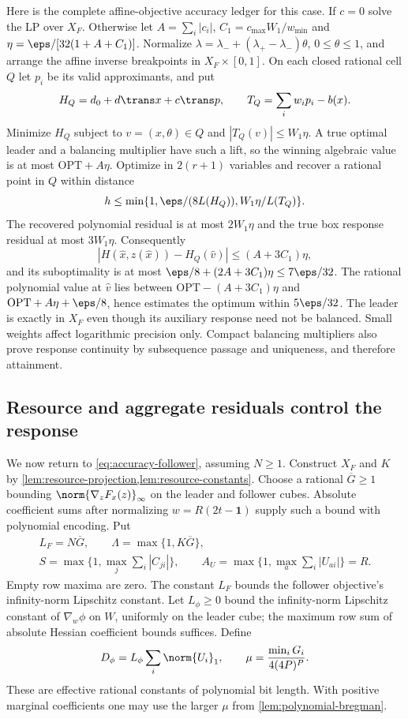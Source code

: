 Here is the complete affine-objective accuracy ledger for this case.
If $c=0$ solve the LP over $X_F$. Otherwise let
$A=\sum_i|c_i|$, $C_1=c_{\max}W_1/w_{\min}$ and
$\eta=\eps/[32(1+A+C_1)]$. Normalize
$\lambda=\lambda_-+(\lambda_+-\lambda_-)\theta$,
$0\le\theta\le1$, and arrange the affine inverse breakpoints in
$X_F\times[0,1]$. On each closed rational cell $Q$ let $p_i$ be its
valid approximants, and put
\[
 H_Q=d_0+d\trans x+c\trans p,\qquad T_Q=\sum_iw_ip_i-b(x).
\]
Minimize $H_Q$ subject to $v=(x,\theta)\in Q$ and
$|T_Q(v)|\le W_1\eta$. A true optimal leader and a balancing multiplier
have such a lift, so the winning algebraic value is at most
$\mathrm{OPT}+A\eta$. Optimize in $2(r+1)$ variables and recover a
rational point in $Q$ within distance
\[
 h\le\min\{1,\eps/(8L(H_Q)),W_1\eta/L(T_Q)\}.
\]
The recovered polynomial residual is at most $2W_1\eta$ and the
true box response residual at most $3W_1\eta$. Consequently
\[
 |H(\widehat x,z(\widehat x))-H_Q(\widehat v)|
      \le(A+3C_1)\eta,
\]
and its suboptimality is at most
$\eps/8+(2A+3C_1)\eta\le7\eps/32$. The rational polynomial value
at $\widehat v$ lies between
$\mathrm{OPT}-(A+3C_1)\eta$ and
$\mathrm{OPT}+A\eta+\eps/8$, hence estimates the optimum within
$5\eps/32$. The leader is exactly in $X_F$ even though its auxiliary
response need not be balanced. Small weights affect logarithmic precision
only. Compact balancing multipliers also prove response continuity by
subsequence passage and uniqueness, and therefore attainment.

\subsection{Resource and aggregate residuals control the response}
\label{subsec:accuracy-certificate}

We now return to \eqref{eq:accuracy-follower}, assuming $N\ge1$.
Construct $X_F$ and $K$ by \cref{lem:resource-projection,lem:resource-constants}.
Choose a rational $\overline G\ge1$ bounding
$\norm{\nabla_zF_x(z)}_\infty$ on the leader and follower cubes.
Absolute coefficient sums after normalizing $w=R(2t-\mathbf1)$
supply such a bound with polynomial encoding. Put
\[
 \begin{gathered}
 L_F=N\overline G,\qquad \Lambda=\max\{1,K\overline G\},\\
 S=\max\{1,\max_j\sum_i|C_{ji}|\},\qquad
 A_U=\max\{1,\max_a\sum_i|U_{ai}|\}=R.
 \end{gathered}
\]
Empty row maxima are zero. The constant $L_F$ bounds the follower
objective's infinity-norm Lipschitz constant. Let $L_\phi\ge0$ bound
the infinity-norm Lipschitz constant of $\nabla_w\phi$ on $W$,
uniformly on the leader cube; the maximum row sum of absolute Hessian
coefficient bounds suffices. Define
\[
 D_\phi=L_\phi\sum_i\norm{U_i}_1,\qquad
                        \mu=\frac{\min_iG_i}{4(4P)^P}.
\]
These are effective rational constants of polynomial bit length. With
positive marginal coefficients one may use the larger $\mu$ from
\cref{lem:polynomial-bregman}.


